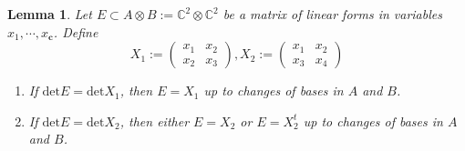 \documentclass[10pt]{article} %
\newcommand{\ccc}{\mathbf{c}}
\newcommand{\BC}{\mathbb{C}}
\newcommand{\ot}{\otimes}
\newtheorem{lem}[thm]{Lemma}
\theoremstyle{definition}
\begin{document}
\begin{lem}\label{appendixlem}
Let $E\subset A\ot B:=\BC^2\ot \BC^2$ be a matrix of linear forms in variables $x_1,\cdots,x_{\ccc}$. Define
$$X_1:=\begin{pmatrix}
    x_1 & x_2\\
    x_2 & x_3
    \end{pmatrix},
X_2:=\begin{pmatrix}
    x_1 & x_2\\
    x_3 & x_4
    \end{pmatrix}$$
\begin{enumerate}
    \item If $\mathrm{det}E=\mathrm{det}X_1$, then $E=X_1$ up to changes of bases in $A$ and $B$.
    \item If $\mathrm{det}E=\mathrm{det}X_2$, then either $E=X_2$ or $E=X_2^t$ up to changes of bases in $A$ and $B$.
\end{enumerate}
\end{lem}
\end{document}
